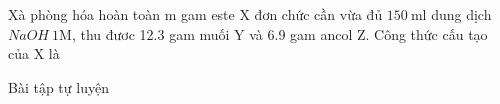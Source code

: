 
\begin{vdex}
	Xà phòng hóa hoàn toàn m gam este X đơn chức cần vừa đủ $ 150 ~\mathrm{ml} $ dung dịch $ NaOH~1\mathrm{M} $, thu đươc 12.3 gam muối Y và 6.9 gam ancol Z. Công thức cấu tạo của X là
	\choice
	{%
	}
	{%
	}
	{%
	}
	{%
		\True {}
	}
	\huongdan
	{%
		
	}
	
\end{vdex}


\newpage
\begin{bttl}{Bài tập tự luyện}

\end{bttl}


